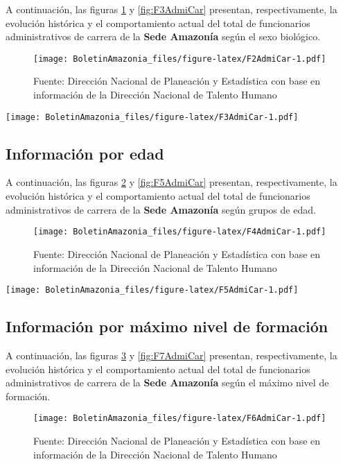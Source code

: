 \documentclass[
]{book}
\begin{document}
A continuación, las figuras \ref{fig:F2AdmiCar} y \ref{fig:F3AdmiCar} presentan, respectivamente, la evolución histórica y el comportamiento actual del total de funcionarios administrativos de carrera de la \textbf{Sede Amazonía} según el sexo biológico.

\begin{figure}
\centering
\texttt{[image: BoletinAmazonia\_files/figure-latex/F2AdmiCar-1.pdf]}
\caption{\label{fig:F2AdmiCar}Fuente: Dirección Nacional de Planeación y Estadística con base en información de la Dirección Nacional de Talento Humano}
\end{figure}

\texttt{[image: BoletinAmazonia\_files/figure-latex/F3AdmiCar-1.pdf]}

\hypertarget{informaciuxf3n-por-edad-11}{%
\subsection{Información por edad}\label{informaciuxf3n-por-edad-11}}

A continuación, las figuras \ref{fig:F4AdmiCar} y \ref{fig:F5AdmiCar} presentan, respectivamente, la evolución histórica y el comportamiento actual del total de funcionarios administrativos de carrera de la \textbf{Sede Amazonía} según grupos de edad.

\begin{figure}
\centering
\texttt{[image: BoletinAmazonia\_files/figure-latex/F4AdmiCar-1.pdf]}
\caption{\label{fig:F4AdmiCar}Fuente: Dirección Nacional de Planeación y Estadística con base en información de la Dirección Nacional de Talento Humano}
\end{figure}

\texttt{[image: BoletinAmazonia\_files/figure-latex/F5AdmiCar-1.pdf]}

\hypertarget{informaciuxf3n-por-muxe1ximo-nivel-de-formaciuxf3n-1}{%
\subsection{Información por máximo nivel de formación}\label{informaciuxf3n-por-muxe1ximo-nivel-de-formaciuxf3n-1}}

A continuación, las figuras \ref{fig:F6AdmiCar} y \ref{fig:F7AdmiCar} presentan, respectivamente, la evolución histórica y el comportamiento actual del total de funcionarios administrativos de carrera de la \textbf{Sede Amazonía} según el máximo nivel de formación.

\begin{figure}
\centering
\texttt{[image: BoletinAmazonia\_files/figure-latex/F6AdmiCar-1.pdf]}
\caption{\label{fig:F6AdmiCar}Fuente: Dirección Nacional de Planeación y Estadística con base en información de la Dirección Nacional de Talento Humano}
\end{figure}
\end{document}
